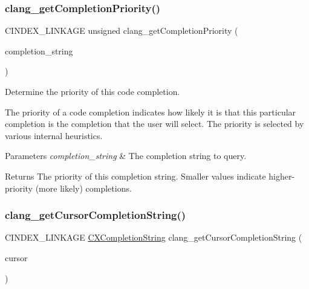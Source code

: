 \subsubsection{\texorpdfstring{clang\+\_\+get\+Completion\+Priority()}{clang\_getCompletionPriority()}}
{\footnotesize\ttfamily C\+I\+N\+D\+E\+X\+\_\+\+L\+I\+N\+K\+A\+GE unsigned clang\+\_\+get\+Completion\+Priority (\begin{DoxyParamCaption}\item[{\hyperlink{group__CINDEX__CODE__COMPLET_gafea23a43a60ec3b4f3bedccfbb76883a}{C\+X\+Completion\+String}}]{completion\+\_\+string }\end{DoxyParamCaption})}



Determine the priority of this code completion. 

The priority of a code completion indicates how likely it is that this particular completion is the completion that the user will select. The priority is selected by various internal heuristics.


\begin{DoxyParams}{Parameters}
{\em completion\+\_\+string} & The completion string to query.\\
\hline
\end{DoxyParams}
\begin{DoxyReturn}{Returns}
The priority of this completion string. Smaller values indicate higher-\/priority (more likely) completions. 
\end{DoxyReturn}
\mbox{\label{group__CINDEX__CODE__COMPLET_ga403bcb1ebc70f1ec9e19543d76685f43}} 
\subsubsection{\texorpdfstring{clang\+\_\+get\+Cursor\+Completion\+String()}{clang\_getCursorCompletionString()}}
{\footnotesize\ttfamily C\+I\+N\+D\+E\+X\+\_\+\+L\+I\+N\+K\+A\+GE \hyperlink{group__CINDEX__CODE__COMPLET_gafea23a43a60ec3b4f3bedccfbb76883a}{C\+X\+Completion\+String} clang\+\_\+get\+Cursor\+Completion\+String (\begin{DoxyParamCaption}\item[{\hyperlink{structCXCursor}{C\+X\+Cursor}}]{cursor }\end{DoxyParamCaption})}



